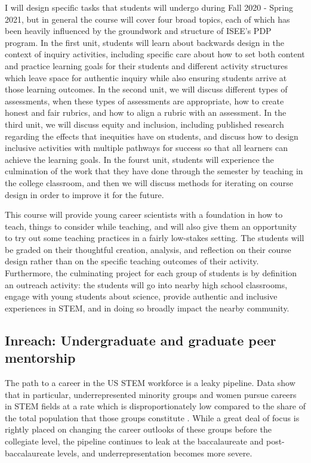 \documentclass[aasms,12pt]{article}
\begin{document}
I will design specific tasks that students will undergo during Fall 2020 - Spring 2021, but in general the course will cover four broad topics, each of which has been heavily influenced by the groundwork and structure of ISEE's PDP program.
In the first unit, students will learn about backwards design in the context of inquiry activities, including specific care about how to set both content and practice learning goals for their students and different activity structures which leave space for authentic inquiry while also ensuring students arrive at those learning outcomes.
In the second unit, we will discuss different types of assessments, when these types of assessments are appropriate, how to create honest and fair rubrics, and how to align a rubric with an assessment.
In the third unit, we will discuss equity and inclusion, including published research regarding the effects that inequities have on students, and discuss how to design inclusive activities with multiple pathways for success so that all learners can achieve the learning goals.
In the fourst unit, students will experience the culmination of the work that they have done through the semester by teaching in the college classroom, and then we will discuss methods for iterating on course design in order to improve it for the future.

This course will provide young career scientists with a foundation in how to teach, things to consider while teaching, and will also give them an opportunity to try out some teaching practices in a fairly low-stakes setting.
The students will be graded on their thoughtful creation, analysis, and reflection on their course design rather than on the specific teaching outcomes of their activity.
Furthermore, the culminating project for each group of students is by definition an outreach activity: the students will go into nearby high school classrooms, engage with young students about science, provide authentic and inclusive experiences in STEM, and in doing so broadly impact the nearby community.

\subsection{Inreach: Undergraduate and graduate peer mentorship}
The path to a career in the US STEM workforce is a leaky pipeline.
Data show that in particular, underrepresented minority groups and women pursue careers in STEM fields at a rate which is disproportionately low compared to the share of the total population that those groups constitute \citep{corbett&hill2015, nsf2019}.
While a great deal of focus is rightly placed on changing the career outlooks of these groups before the collegiate level, the pipeline continues to leak at the baccalaureate and post-baccalaureate levels, and underrepresentation becomes more severe.
\end{document}
